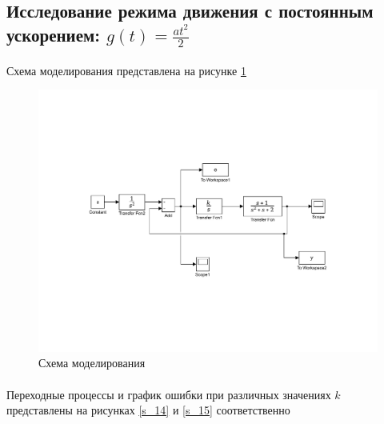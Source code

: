 \documentclass[a4paper,12pt]{article}
\begin{document}
	\subsection{Исследование режима движения с постоянным ускорением: $g(t)=\frac{at^2}{2}$}
	\paragraph {} Схема моделирования представлена на рисунке \ref{s_13}
	
	\begin{figure}[h]
		\renewcommand{\figurename}{Рисунок}
		\centering
		\includegraphics[width=6in]{Astatizm1aMOD.pdf}
		\caption{Схема моделирования}
		\label{s_13}
	\end{figure}
	\newpage 
	\paragraph {}Переходные процессы и график ошибки при различных значениях $k$ представлены на рисунках \ref{s_14} и \ref{s_15} соответственно
	
\end{document}
